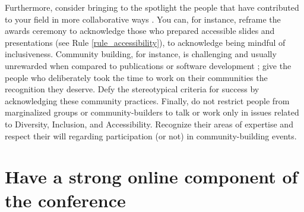 \documentclass[10pt,letterpaper]{article}
\begin{document}
Furthermore, consider bringing to the spotlight the people that have contributed to your field in more collaborative ways \cite{cheng2020x+}. You can, for instance, reframe the awards ceremony to acknowledge those who prepared accessible slides and presentations (see Rule \ref{rule_accessibility}), to acknowledge being mindful of inclusiveness. Community building, for instance, is challenging and usually unrewarded when compared to publications or software development \cite{acionWhyChooseCommunity2020}; give the people who deliberately took the time to work on their communities the recognition they deserve. Defy the stereotypical criteria for success by acknowledging these community practices. 
Finally, do not restrict people from marginalized groups or community-builders to talk or work only in issues related to Diversity, Inclusion, and Accessibility. Recognize their areas of expertise and respect their will regarding participation (or not) in community-building events.


\section{Have a strong online component of the conference} 
\label{rule_online}
\end{document}
